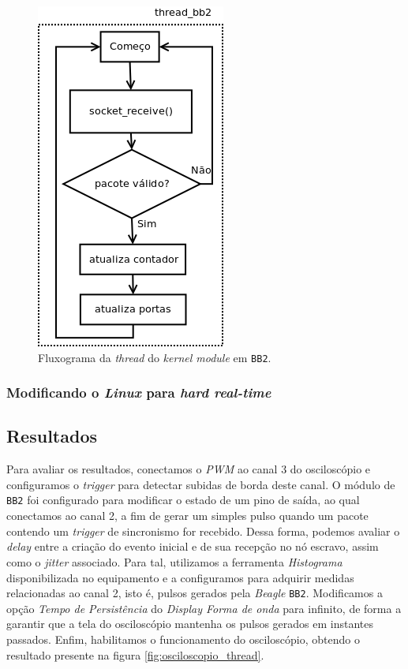 \begin{figure}[h]

\centering
\includegraphics[scale=0.55]{image/thread_bb2}
\caption {Fluxograma da \textit{thread} do \textit{kernel module} em
\texttt{BB2}.}
\label{fig:thread_bb2}
\end{figure}

\FloatBarrier

\subsubsection{Modificando o \textit{Linux} para \textit{hard real-time}}



\subsection {Resultados}

Para avaliar os resultados, conectamos o \textit{PWM} ao canal 3 do osciloscópio
e configuramos o \textit{trigger} para detectar subidas de borda deste canal. O
módulo de \texttt{BB2} foi configurado para modificar o estado de um pino de
saída, ao qual conectamos ao canal 2, a fim de gerar um simples pulso quando um
pacote contendo um \textit{trigger} de sincronismo for recebido. Dessa forma,
podemos avaliar o \textit{delay} entre a criação do evento inicial e de sua
recepção no nó escravo, assim como o \textit{jitter} associado. Para tal,
utilizamos a ferramenta \textit{Histograma} disponibilizada no equipamento e a
configuramos para adquirir medidas relacionadas ao canal 2, isto é, pulsos
gerados pela \textit{Beagle} \texttt{BB2}. Modificamos a opção \textit{Tempo de
Persistência} do \textit{Display Forma de onda} para infinito, de forma a
garantir que a tela do osciloscópio mantenha os pulsos gerados em instantes
passados. Enfim, habilitamos o funcionamento do osciloscópio, obtendo o
resultado presente na figura \ref{fig:osciloscopio_thread}.

